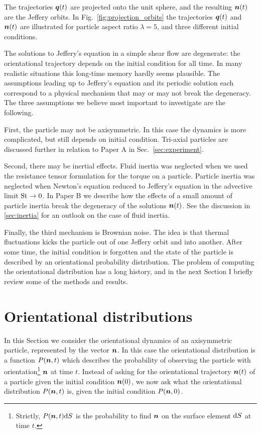 \documentclass[thesis.tex]{subfiles}
\begin{document}
The trajectories $\mbox{\boldmath$q$}(t)$ are projected onto the unit sphere, and the resulting $\mbox{\boldmath$n$}(t)$ are the Jeffery orbits. In Fig.~\ref{fig:projection_orbits} the trajectories $\mbox{\boldmath$q$}(t)$ and $\mbox{\boldmath$n$}(t)$ are illustrated for particle aspect ratio $\lambda=5$, and three different initial conditions.

The solutions to Jeffery's equation in a simple shear flow are degenerate: the orientational trajectory depends on the initial condition for all time. In many realistic situations this long-time memory hardly seems plausible. The assumptions leading up to Jeffery's equation and its periodic solution each correspond to a physical mechanism that may or may not break the degeneracy. The three assumptions we believe most important to investigate are the following.

First, the particle may not be axisymmetric. In this case the dynamics is more complicated, but still depends on initial condition. Tri-axial particles are discussed further in relation to Paper A in Sec.~\ref{sec:experiment}.

Second, there may be inertial effects. Fluid inertia was neglected when we used the resistance tensor formulation  for the torque on a particle. Particle inertia was neglected when Newton's equation reduced to Jeffery's equation in the advective limit $\mbox{St} \to 0$. In Paper B we describe how the effects of a small amount of particle inertia break the degeneracy of the solutions $\mbox{\boldmath$n$}(t)$. See the discussion in \ref{sec:inertia} for an outlook on the case of fluid inertia.

Finally, the third mechanism is Brownian noise. The idea is that thermal fluctuations kicks the particle out of one Jeffery orbit and into another. After some time, the initial condition is forgotten and the state of the particle is described by an orientational probability distribution. The problem of computing the orientational distribution has a long history, and in the next Section I briefly review some of the methods and results.

\section{Orientational distributions}\label{sec:orientationaldistributions}

In this Section we consider the orientational dynamics of an axisymmetric particle, represented by the vector $\mbox{\boldmath$n$}$. In this case the orientational distribution is a function $P(\mbox{\boldmath$n$}, t)$ which describes the probability of observing the particle with orientation\footnote{Strictly, $P(\mbox{\boldmath$n$}, t)\mathrm{d} S$ is the probability to find $\mbox{\boldmath$n$}$ on the surface element $\mathrm{d} S$ at time $t$.} $\mbox{\boldmath$n$}$ at time $t$. Instead of asking for the orientational trajectory $\mbox{\boldmath$n$}(t)$ of a particle given the initial condition $\mbox{\boldmath$n$}(0)$, we now ask what the orientational distribution $P(\mbox{\boldmath$n$}, t)$ is, given the initial condition $P(\mbox{\boldmath$n$}, 0)$.
\end{document}
